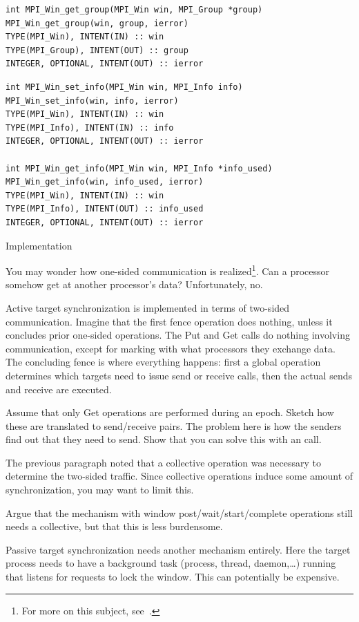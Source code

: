 \begin{verbatim}
int MPI_Win_get_group(MPI_Win win, MPI_Group *group) 
MPI_Win_get_group(win, group, ierror) 
TYPE(MPI_Win), INTENT(IN) :: win 
TYPE(MPI_Group), INTENT(OUT) :: group 
INTEGER, OPTIONAL, INTENT(OUT) :: ierror
\end{verbatim}

\begin{verbatim}
int MPI_Win_set_info(MPI_Win win, MPI_Info info)
MPI_Win_set_info(win, info, ierror)
TYPE(MPI_Win), INTENT(IN) :: win
TYPE(MPI_Info), INTENT(IN) :: info
INTEGER, OPTIONAL, INTENT(OUT) :: ierror

int MPI_Win_get_info(MPI_Win win, MPI_Info *info_used)
MPI_Win_get_info(win, info_used, ierror)
TYPE(MPI_Win), INTENT(IN) :: win
TYPE(MPI_Info), INTENT(OUT) :: info_used
INTEGER, OPTIONAL, INTENT(OUT) :: ierror
\end{verbatim}

 {Implementation}

You may wonder how one-sided communication is realized\footnote{For
  more on this subject, see~\cite{thakur:ijhpca-sync}.}. Can a processor
somehow get at another processor's data? Unfortunately, no.

Active target synchronization is implemented in terms of two-sided communication.
Imagine that the first fence operation does nothing, unless it concludes prior
one-sided operations. The Put and Get calls do nothing involving communication,
except for marking with what processors they exchange data.
The concluding fence is where everything happens: first a global operation
determines which targets need to issue send or receive calls, then the
actual sends and receive are executed.

\begin{exercise}
  Assume that only Get operations are performed during an epoch. 
  Sketch how these are translated to send/receive pairs. 
  The problem here is how the senders find out that they need to send.
  Show that you can solve this with an  call.
\end{exercise}

The previous paragraph noted that a collective operation was necessary
to determine the two-sided traffic. Since collective operations induce
some amount of synchronization, you may want to limit this.

\begin{exercise}
  Argue that the mechanism with window post/wait/start/complete operations
  still needs a collective, but that this is less burdensome.
\end{exercise}

Passive target synchronization needs another mechanism entirely.  Here
the target process needs to have a background task (process, thread,
daemon,\ldots) running that listens for requests to lock the
window. This can potentially be expensive.


